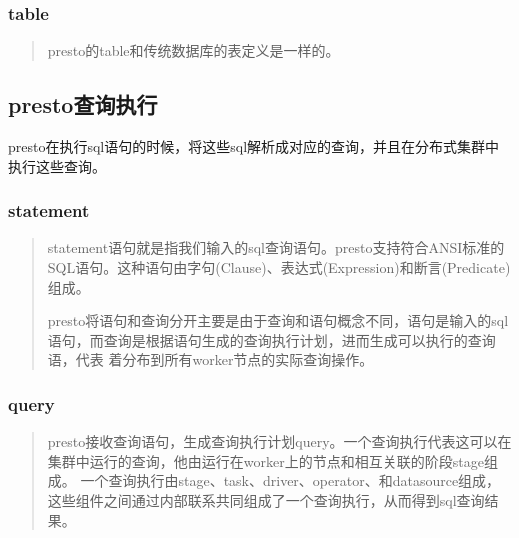 \documentclass[letterpaper,10pt,english]{sphinxmanual}
\begin{document}
\subsubsection{table}
\label{\detokenize{overview/concept:table}}\begin{quote}

presto的table和传统数据库的表定义是一样的。
\end{quote}


\subsection{presto查询执行}
\label{\detokenize{overview/concept:id3}}
\begin{sphinxVerbatim}[commandchars=\\\{\}]
presto在执行sql语句的时候，将这些sql解析成对应的查询，并且在分布式集群中执行这些查询。
\end{sphinxVerbatim}

\noindent{}


\subsubsection{statement}
\label{\detokenize{overview/concept:statement}}\begin{quote}

statement语句就是指我们输入的sql查询语句。presto支持符合ANSI标准的SQL语句。这种语句由字句(Clause)、表达式(Expression)和断言(Predicate)组成。

presto将语句和查询分开主要是由于查询和语句概念不同，语句是输入的sql语句，而查询是根据语句生成的查询执行计划，进而生成可以执行的查询语，代表
着分布到所有worker节点的实际查询操作。
\end{quote}


\subsubsection{query}
\label{\detokenize{overview/concept:query}}\begin{quote}

presto接收查询语句，生成查询执行计划query。一个查询执行代表这可以在集群中运行的查询，他由运行在worker上的节点和相互关联的阶段stage组成。
一个查询执行由stage、task、driver、operator、和datasource组成，这些组件之间通过内部联系共同组成了一个查询执行，从而得到sql查询结果。
\end{quote}
\end{document}
